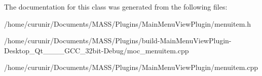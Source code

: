 The documentation for this class was generated from the following files\+:\begin{DoxyCompactItemize}
\item 
/home/curunir/\+Documents/\+M\+A\+S\+S/\+Plugins/\+Main\+Menu\+View\+Plugin/menuitem.\+h\item 
/home/curunir/\+Documents/\+M\+A\+S\+S/\+Plugins/build-\/\+Main\+Menu\+View\+Plugin-\/\+Desktop\+\_\+\+Qt\+\_\+\_\+\_\+\_\+\+G\+C\+C\+\_\+32bit-\/\+Debug/moc\+\_\+menuitem.\+cpp\item 
/home/curunir/\+Documents/\+M\+A\+S\+S/\+Plugins/\+Main\+Menu\+View\+Plugin/menuitem.\+cpp\end{DoxyCompactItemize}
